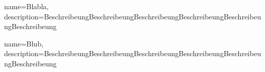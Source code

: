 {name=Blabla,
description={BeschreibeungBeschreibeungBeschreibeungBeschreibeungBeschreibeungBeschreibeung}}

{name=Blub,
description={BeschreibeungBeschreibeungBeschreibeungBeschreibeungBeschreibeungBeschreibeung}}